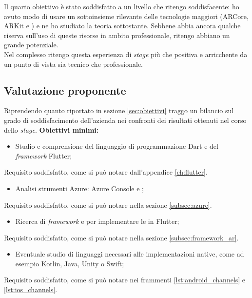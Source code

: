 Il quarto obiettivo è stato soddisfatto a un livello che ritengo soddisfacente: ho avuto modo di usare un sottoinsieme rilevante delle tecnologie maggiori (ARCore, ARKit e \asa{}) e ne ho studiato la teoria sottostante. Sebbene abbia ancora qualche riserva sull'uso di queste risorse in ambito professionale, ritengo abbiano un grande potenziale.\\
Nel complesso ritengo questa esperienza di \textit{stage} più che positiva e arricchente da un punto di vista sia tecnico che professionale.

\subsection{Valutazione proponente}
Riprendendo quanto riportato in sezione \ref{sec:obiettivi} traggo un bilancio sul grado di soddisfacimento dell'azienda nei confronti dei risultati ottenuti nel corso dello \textit{stage}.
\aCapo{}
\textbf{Obiettivi minimi:}

\begin{itemize}
  \item Studio e comprensione del linguaggio di programmazione Dart e del \textit{framework} Flutter;
\end{itemize}

Requisito soddisfatto, come si può notare dall'appendice \ref{ch:flutter}.

\begin{itemize}
  \item Analisi strumenti Azure: Azure Console e \asa{};
\end{itemize}

Requisito soddisfatto, come si può notare nella sezione \ref{subsec:azure}.

\begin{itemize}
  \item Ricerca di \textit{framework} e \sdk{} per implementare le \asa{} in Flutter;
\end{itemize}

Requisito soddisfatto, come si può notare nella sezione \ref{subsec:framework_ar}.

\begin{itemize}
  \item Eventuale studio di linguaggi necessari alle implementazioni native, come ad esempio Kotlin, Java, Unity o Swift;
\end{itemize}

Requisito soddisfatto, come si può notare nei frammenti \ref{lst:android_channels} e \ref{lst:ios_channels}.

